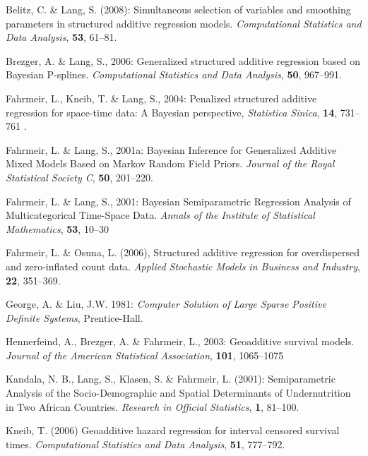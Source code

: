 \documentclass[11pt,a4paper,twoside]{bayesxreport}
\begin{document}
\begin{thebibliography}{99}

 Belitz, C. \& Lang, S.  (2008): Simultaneous selection of variables and smoothing
parameters in structured additive regression models. {\it Computational Statistics and Data Analysis}, {\bf 53}, 61--81.

 Brezger, A. \& Lang, S., 2006: Generalized structured additive regression based
on Bayesian P-splines. {\it Computational Statistics and Data Analysis}, {\bf 50}, 967--991.

 Fahrmeir, L., Kneib, T. \& Lang, S., 2004: Penalized structured additive
regression for space-time data: A Bayesian perspective, {\it Statistica Sinica}, {\bf 14}, 731--761 .

 Fahrmeir, L. \& Lang, S., 2001a: Bayesian Inference for Generalized Additive
Mixed Models Based on Markov Random Field Priors. {\it Journal of the Royal Statistical Society C}, {\bf 50}, 201--220.

 Fahrmeir, L. \& Lang, S., 2001: Bayesian Semiparametric Regression Analysis of
Multicategorical Time-Space Data. {\it Annals of the Institute of Statistical Mathematics}, {\bf 53}, 10--30

 Fahrmeir, L. \& Osuna, L. (2006), Structured additive regression for
overdispersed and zero-inflated count data. {\it Applied Stochastic Models in Business and Industry}, {\bf 22}, 351--369.

 George, A. \& Liu, J.W. 1981: {\it Computer Solution of Large Sparse Positive
Definite Systems}, Prentice-Hall.

 Hennerfeind, A., Brezger, A. \& Fahrmeir, L., 2003: Geoadditive
survival models. {\it Journal of the American Statistical Association}, {\bf 101}, 1065--1075

 Kandala, N. B., Lang, S., Klasen, S. \& Fahrmeir, L. (2001): Semiparametric
Analysis of the Socio-Demographic and Spatial Determinants of Undernutrition in Two African Countries. {\it Research in
Official Statistics}, {\bf 1}, 81--100.

  {Kneib, T.} (2006) Geoadditive hazard regression for interval censored
 survival times. {\it Computational Statistics and Data Analysis}, {\bf 51}, 777--792.


\end{thebibliography}
\end{document}
